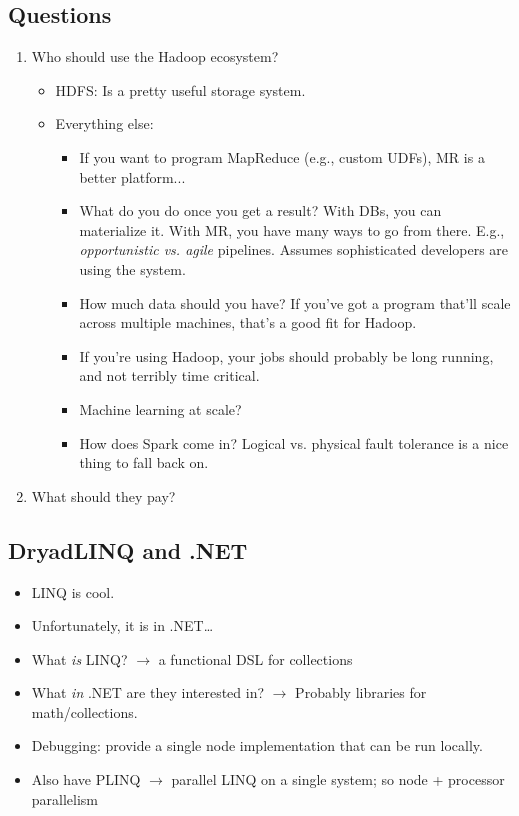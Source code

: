 \documentclass[10pt]{article}
\begin{document}
\subsection{Questions}

\begin{enumerate}
\item Who should use the Hadoop ecosystem?
\begin{itemize}
\item HDFS: Is a pretty useful storage system.
\item Everything else:
\begin{itemize}
\item If you want to program MapReduce (e.g., custom UDFs), MR is a better platform...
\item What do you do once you get a result? With DBs, you can materialize it. With MR, you have many
ways to go from there. E.g., \emph{opportunistic vs. agile} pipelines. Assumes sophisticated developers
are using the system.
\item How much data should you have? If you've got a program that'll scale across multiple machines,
that's a good fit for Hadoop.
\item If you're using Hadoop, your jobs should probably be long running, and not terribly time critical.
\item Machine learning at scale?
\item How does Spark come in? Logical vs. physical fault tolerance is a nice thing to fall back on.
\end{itemize}
\end{itemize}
\item What should they pay?
\end{enumerate}

\subsection{DryadLINQ and .NET}

\begin{itemize}
\item LINQ is cool.
\item Unfortunately, it is in .NET\dots
\item What \emph{is} LINQ? $\rightarrow$ a functional DSL for collections
\item What \emph{in} .NET are they interested in? $\rightarrow$ Probably libraries for math/collections.
\item Debugging: provide a single node implementation that can be run locally.
\item Also have PLINQ $\rightarrow$ parallel LINQ on a single system; so node + processor parallelism
\end{itemize}
\end{document}
